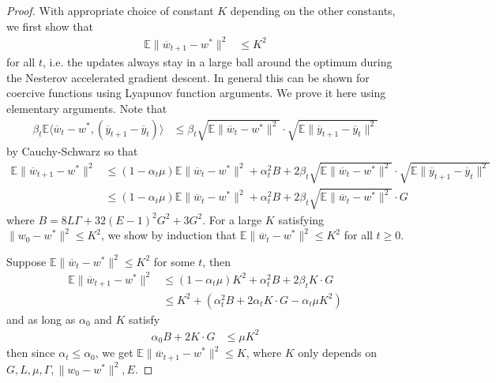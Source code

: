 \begin{proof}
	With appropriate choice of constant $K$ depending on the other constants,
	we first show that 
	\begin{align*}
	\mathbb{E}\|\overline{w}_{t+1}-w^{\ast}\|^{2} & \leq K^{2}
	\end{align*}
	for all $t$, i.e. the updates always stay in a large ball around
	the optimum during the Nesterov accelerated gradient descent. In general
	this can be shown for coercive functions using Lyapunov function arguments.
	We prove it here using elementary arguments. Note that
	\begin{align*}
	\beta_{t}\mathbb{E}\langle\overline{w}_{t}-w^{\ast},(\overline{y}_{t+1}-\overline{y}_{t})\rangle & \leq\beta_{t}\sqrt{\mathbb{E}\|\overline{w}_{t}-w^{\ast}\|^{2}}\cdot\sqrt{\mathbb{E}\|\overline{y}_{t+1}-\overline{y}_{t}\|^{2}}
	\end{align*}
	by Cauchy-Schwarz so that 
	\begin{align*}
	\mathbb{E}\|\overline{w}_{t+1}-w^{\ast}\|^{2} & \leq(1-\alpha_{t}\mu)\mathbb{E}\|\overline{w}_{t}-w^{\ast}\|^{2}+\alpha_{t}^{2}B+2\beta_{t}\sqrt{\mathbb{E}\|\overline{w}_{t}-w^{\ast}\|^{2}}\cdot\sqrt{\mathbb{E}\|\overline{y}_{t+1}-\overline{y}_{t}\|^{2}}\\
	& \leq(1-\alpha_{t}\mu)\mathbb{E}\|\overline{w}_{t}-w^{\ast}\|^{2}+\alpha_{t}^{2}B+2\beta_{t}\sqrt{\mathbb{E}\|\overline{w}_{t}-w^{\ast}\|^{2}}\cdot G
	\end{align*}
	where $B=8L\Gamma+32(E-1)^{2}G^{2}+3G^{2}$. For a large $K$ satisfying
	$\|w_{0}-w^{\ast}\|^{2}\leq K^{2}$, we show by induction that $\mathbb{E}\|\overline{w}_{t}-w^{\ast}\|^{2}\leq K^{2}$
	for all $t\geq0$. 
	
	Suppose $\mathbb{E}\|\overline{w}_{t}-w^{\ast}\|^{2}\leq K^{2}$ for
	some $t$, then 
	\begin{align*}
	\mathbb{E}\|\overline{w}_{t+1}-w^{\ast}\|^{2} & \leq(1-\alpha_{t}\mu)K^{2}+\alpha_{t}^{2}B+2\beta_{t}K\cdot G\\
	& \leq K^{2}+(\alpha_{t}^{2}B+2\alpha_{t}K\cdot G-\alpha_{t}\mu K^{2})
	\end{align*}
	and as long as $\alpha_{0}$ and $K$ satisfy 
	\begin{align*}
	\alpha_{0}B+2K\cdot G & \leq\mu K^{2}
	\end{align*}
	then since $\alpha_{t}\leq\alpha_{0}$, we get $\mathbb{E}\|\overline{w}_{t+1}-w^{\ast}\|^{2}\leq K$,
	where $K$ only depends on $G,L,\mu,\Gamma,\|w_{0}-w^{\ast}\|^{2},E$. 
	

\end{proof}
